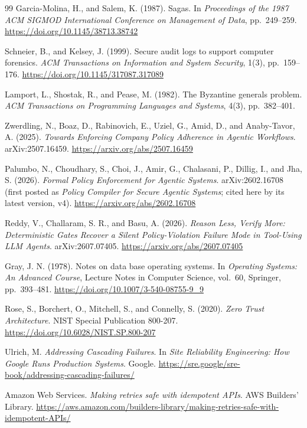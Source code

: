 \documentclass[11pt,a4paper]{article}
\begin{document}
\sloppy
\begin{thebibliography}{99}
Garcia-Molina, H., and Salem, K. (1987). Sagas. In \emph{Proceedings of the 1987 ACM SIGMOD International Conference on Management of Data}, pp.~249--259. \url{https://doi.org/10.1145/38713.38742}

Schneier, B., and Kelsey, J. (1999). Secure audit logs to support computer forensics. \emph{ACM Transactions on Information and System Security}, 1(3), pp.~159--176. \url{https://doi.org/10.1145/317087.317089}

Lamport, L., Shostak, R., and Pease, M. (1982). The Byzantine generals problem. \emph{ACM Transactions on Programming Languages and Systems}, 4(3), pp.~382--401.

Zwerdling, N., Boaz, D., Rabinovich, E., Uziel, G., Amid, D., and Anaby-Tavor, A. (2025). \emph{Towards Enforcing Company Policy Adherence in Agentic Workflows}. arXiv:2507.16459. \url{https://arxiv.org/abs/2507.16459}

Palumbo, N., Choudhary, S., Choi, J., Amir, G., Chalasani, P., Dillig, I., and Jha, S. (2026). \emph{Formal Policy Enforcement for Agentic Systems}. arXiv:2602.16708 (first posted as \emph{Policy Compiler for Secure Agentic Systems}; cited here by its latest version, v4). \url{https://arxiv.org/abs/2602.16708}

Reddy, V., Challaram, S. R., and Basu, A. (2026). \emph{Reason Less, Verify More: Deterministic Gates Recover a Silent Policy-Violation Failure Mode in Tool-Using LLM Agents}. arXiv:2607.07405. \url{https://arxiv.org/abs/2607.07405}

Gray, J. N. (1978). Notes on data base operating systems. In \emph{Operating Systems: An Advanced Course}, Lecture Notes in Computer Science, vol.~60, Springer, pp.~393--481. \url{https://doi.org/10.1007/3-540-08755-9_9}

Rose, S., Borchert, O., Mitchell, S., and Connelly, S. (2020). \emph{Zero Trust Architecture}. NIST Special Publication 800-207. \url{https://doi.org/10.6028/NIST.SP.800-207}

Ulrich, M. \emph{Addressing Cascading Failures}. In \emph{Site Reliability Engineering: How Google Runs Production Systems}. Google. \url{https://sre.google/sre-book/addressing-cascading-failures/}

Amazon Web Services. \emph{Making retries safe with idempotent APIs}. AWS Builders' Library. \url{https://aws.amazon.com/builders-library/making-retries-safe-with-idempotent-APIs/}


\end{thebibliography}
\end{document}
